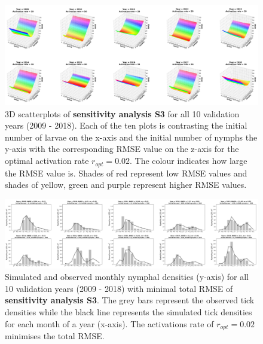 \documentclass[a4paper, 11pt]{scrartcl}
\begin{document}
\begin{figure}
\centering
\includegraphics[width=\linewidth]{figures/independent_initial_ticks_with_beech_error.png}
\caption{3D scatterplots of \textbf{sensitivity analysis S3} for all 10 validation years (2009 - 2018). Each of the ten plots is contrasting the initial number of larvae on the
x-axis and the initial number of nymphs the y-axis with the corresponding RMSE value on the z-axis for the optimal activation rate $r_{opt} = 0.02$. The colour indicates how large
the RMSE value is. Shades of red represent low RMSE values and shades of yellow, green and purple represent higher RMSE values.}
\label{fig:independent_initial_ticks_with_beech_error_rotated}
\end{figure}

\begin{figure}
\centering
\includegraphics[width=\linewidth]{figures/independent_initial_ticks_with_beech.png}
\caption{Simulated and observed monthly nymphal densities (y-axis) for all 10 validation years (2009 - 2018) with minimal total RMSE of \textbf{sensitivity analysis S3}. The grey
bars represent the observed tick densities while the black line represents the simulated tick densities for each month of a year (x-axis). The activations rate of
$r_{opt}= 0.02$ minimises the total RMSE.}
\label{fig:independent_initial_ticks_with_beech_rotated}
\end{figure}
\end{document}
